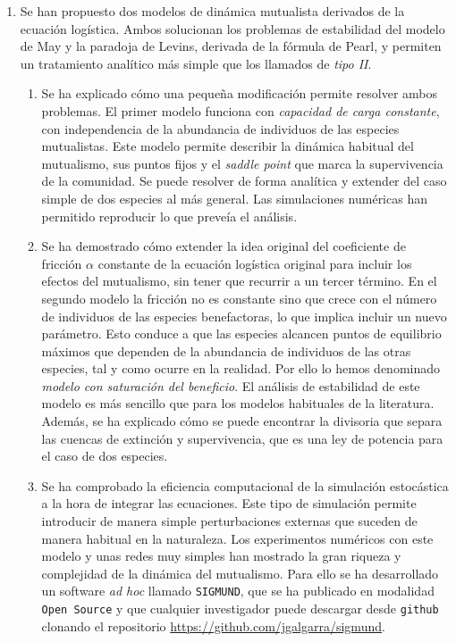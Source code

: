 \begin{enumerate}
\item Se han propuesto dos modelos de dinámica mutualista derivados de la ecuación logística. Ambos solucionan los problemas de estabilidad del modelo de May y la paradoja de Levins, derivada de la fórmula de Pearl, y permiten un tratamiento analítico más simple que los llamados de \textit{tipo II}.
	\begin{enumerate}
	\item Se ha explicado cómo una pequeña modificación permite resolver ambos problemas. El primer modelo funciona con \textit{capacidad de carga constante}, con independencia de la abundancia de individuos de las especies mutualistas. Este modelo permite describir la dinámica habitual del mutualismo, sus puntos fijos y el \textit{saddle point} que marca la supervivencia de la comunidad. Se puede resolver de forma analítica y extender del caso simple de dos especies al más general. Las simulaciones numéricas han permitido reproducir lo que preveía el análisis.
	\item Se ha demostrado cómo extender la idea original del coeficiente de fricción $\alpha$ constante de la ecuación logística original para incluir los efectos del mutualismo, sin tener que recurrir a un tercer término. En el segundo modelo la fricción no es constante sino que crece con el número de individuos de las especies benefactoras, lo que implica incluir un nuevo parámetro. Esto conduce a que las especies alcancen puntos de equilibrio máximos que dependen de la abundancia de individuos de las otras especies, tal y como ocurre en la realidad. Por ello lo hemos denominado \textit{modelo con saturación del beneficio}. 
	El análisis de estabilidad de este modelo es más sencillo que para los modelos habituales de la literatura. Además, se ha explicado cómo se puede encontrar la divisoria que separa las cuencas de extinción y supervivencia, que es una ley de potencia para el caso de dos especies.
	\item Se ha comprobado la eficiencia computacional de la simulación estocástica a la hora de integrar las ecuaciones. Este tipo de simulación permite introducir de manera simple perturbaciones externas que suceden de manera habitual en la naturaleza. Los experimentos numéricos con este modelo y unas redes muy simples han mostrado la gran riqueza y complejidad de la dinámica del mutualismo. Para ello se ha desarrollado un software \textit{ad hoc} llamado \texttt{SIGMUND}, que se ha publicado en modalidad \texttt{Open Source} y que cualquier investigador puede descargar desde \texttt{github} clonando el repositorio \url{https://github.com/jgalgarra/sigmund}.
	\end{enumerate}
	


\end{enumerate}
